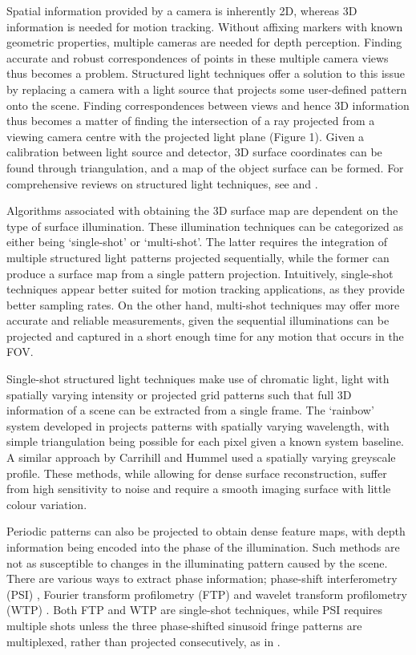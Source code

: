 \documentclass[class=article, crop=false]{standalone}
\begin{document}
Spatial information provided by a camera is inherently 2D, whereas 3D information is needed for motion tracking. Without affixing markers with known geometric properties, multiple cameras are needed for depth perception. Finding accurate and robust correspondences of points in these multiple camera views thus becomes a problem. Structured light techniques offer a solution to this issue by replacing a camera with a light source that projects some user-defined pattern onto the scene. Finding correspondences between views and hence 3D information thus becomes a matter of finding the intersection of a ray projected from a viewing camera centre with the projected light plane (Figure 1). Given a calibration between light source and detector, 3D surface coordinates can be found through triangulation, and a map of the object surface can be formed. For comprehensive reviews on structured light techniques, see \cite{Geng2011} and \cite{Salvi2010}.
\par
Algorithms associated with obtaining the 3D surface map are dependent on the type of surface illumination. These illumination techniques can be categorized as either being ‘single-shot’ or ‘multi-shot’. The latter requires the integration of multiple structured light patterns projected sequentially, while the former can produce a surface map from a single pattern projection. Intuitively, single-shot techniques appear better suited for motion tracking applications, as they provide better sampling rates. On the other hand, multi-shot techniques may offer more accurate and reliable measurements, given the sequential illuminations can be projected and captured in a short enough time for any motion that occurs in the FOV. 
\par
Single-shot structured light techniques make use of chromatic light, light with spatially varying intensity or projected grid patterns such that full 3D information of a scene can be extracted from a single frame. The `rainbow' system developed in \parencite{JasonGeng1996} projects patterns with spatially varying wavelength, with simple triangulation being possible for each pixel given a known system baseline. A similar approach by Carrihill and Hummel \parencite*{Carrihill1985} used a spatially varying greyscale profile. These methods, while allowing for dense surface reconstruction, suffer from high sensitivity to noise and require a smooth imaging surface with little colour variation.
\par
Periodic patterns can also be projected to obtain dense feature maps, with depth information being encoded into the phase of the illumination. Such methods are not as susceptible to changes in the illuminating pattern caused by the scene. There are various ways to extract phase information; phase-shift interferometry (PSI) \parencite{ISI:A1974U657500060,Huang1999}, Fourier transform profilometry (FTP) \parencite{Takeda:83,Yue20071170} and wavelet transform profilometry (WTP) \parencite{Gdeisat2006482,Fernandez2010}. Both FTP and WTP are single-shot techniques, while PSI requires multiple shots unless the three phase-shifted sinusoid fringe patterns are multiplexed, rather than projected consecutively, as in \cite{Huang1999}.
\par



	
\end{document}
